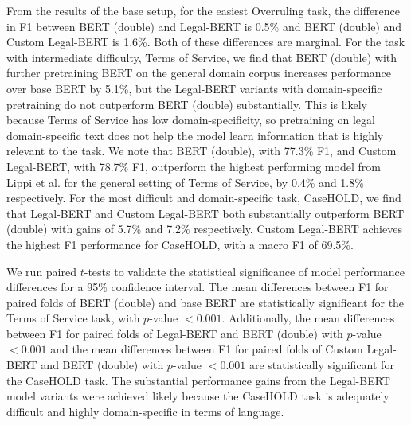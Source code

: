 \documentclass[sigconf]{acmart}
\begin{document}
From the results of the base setup, for the easiest Overruling task, the difference in F1 between BERT (double) and Legal-BERT is 0.5\% and BERT (double) and Custom Legal-BERT is 1.6\%. Both of these differences are marginal. For the task with intermediate difficulty, Terms of Service, we find that BERT (double) with further pretraining BERT on the general domain corpus increases performance over base BERT by 5.1\%, but the Legal-BERT variants with domain-specific pretraining do not outperform BERT (double) substantially. This is likely because Terms of Service has low domain-specificity, so pretraining on legal domain-specific text does not help the model learn information that is highly relevant to the task. We note that BERT (double), with 77.3\% F1, and Custom Legal-BERT, with 78.7\% F1, outperform the highest performing model from Lippi et al. \cite{Lippi_2019} for the general setting of Terms of Service, by 0.4\% and 1.8\% respectively. For the most difficult and domain-specific task, CaseHOLD, we find that Legal-BERT and Custom Legal-BERT both substantially outperform BERT (double) with gains of 5.7\% and 7.2\% respectively. Custom Legal-BERT achieves the highest F1 performance for CaseHOLD, with a macro F1 of 69.5\%.

We run paired $t$-tests to validate the statistical significance of model performance differences for a 95\% confidence interval. The mean differences between F1 for paired folds of BERT (double) and base BERT are statistically significant for the Terms of Service task, with $p$-value $<0.001$. Additionally, the mean differences between F1 for paired folds of Legal-BERT and BERT (double) with $p$-value $<0.001$ and the mean differences between F1 for paired folds of Custom Legal-BERT and BERT (double) with $p$-value $<0.001$ are statistically significant for the CaseHOLD task. The substantial performance gains from the Legal-BERT model variants were achieved likely because the CaseHOLD task is adequately difficult and highly domain-specific in terms of language.
\end{document}
